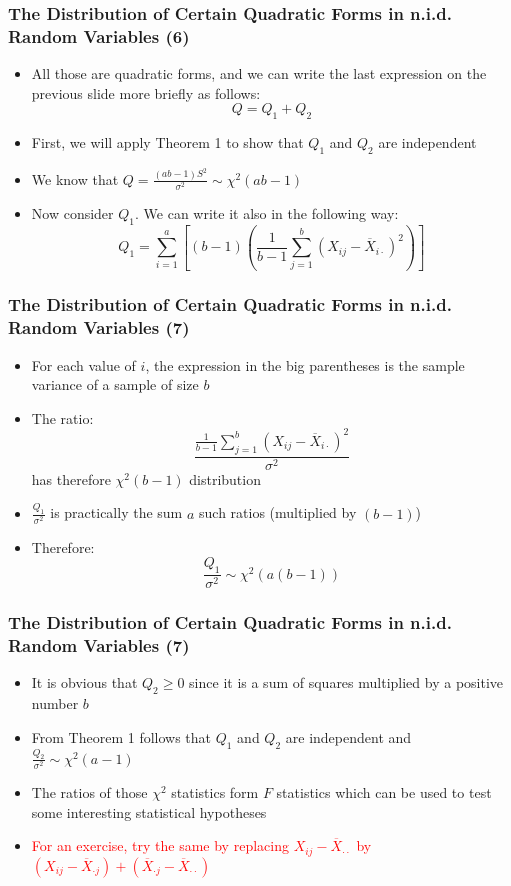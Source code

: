 \documentclass[10pt]{beamer}
\theoremstyle{definition}
\begin{document}
\begin{frame}[fragile]
\frametitle{The Distribution of Certain Quadratic Forms in n.i.d. Random Variables (6)}
\begin{itemize}
	\item All those are quadratic forms, and we can write the last expression on the previous slide more briefly as follows:
	\[
		Q = Q_{1} + Q_{2}
	\]
	\item First, we will apply Theorem 1 to show that $Q_{1}$ and $Q_{2}$ are independent
	\item We know that $\displaystyle Q = \frac{(ab-1)S^{2}}{\sigma^{2}} \sim \chi^{2}(ab-1)$
	\item Now consider $Q_{1}$. We can write it also in the following way:
	\[
		Q_{1} = \sum_{i=1}^{a}\left[(b-1)\left(\frac{1}{b-1}\sum_{j=1}^{b}(X_{ij} - \overline{X}_{i\cdot})^{2}\right)\right]
	\]
\end{itemize}
\end{frame}

\begin{frame}[fragile]
\frametitle{The Distribution of Certain Quadratic Forms in n.i.d. Random Variables (7)}
\begin{itemize}
	\item For each value of $i$, the expression in the big parentheses is the sample variance of a sample of size $b$
	\item The ratio:
	\[
		\frac{\displaystyle \frac{1}{b-1}\sum_{j=1}^{b}(X_{ij} - \overline{X}_{i\cdot})^{2}}{\sigma^{2}}
	\]
	has therefore $\chi^{2}(b-1)$ distribution
	\item $\displaystyle \frac{Q_{1}}{\sigma^{2}}$ is practically the sum $a$ such ratios (multiplied by $(b-1)$)
	\item Therefore:
	\[
		\frac{Q_{1}}{\sigma^{2}} \sim \chi^{2}(a(b-1))
	\]
\end{itemize}
\end{frame}

\begin{frame}[fragile]
\frametitle{The Distribution of Certain Quadratic Forms in n.i.d. Random Variables (7)}
\begin{itemize}
	\item It is obvious that $Q_{2} \geq 0$ since it is a sum of squares multiplied by a positive number $b$
	\item From Theorem 1 follows that $Q_{1}$ and $Q_{2}$ are independent and $\displaystyle \frac{Q_{2}}{\sigma^{2}} \sim \chi^{2}(a-1)$
	\item The ratios of those $\chi^{2}$ statistics form $F$ statistics which can be used to test some interesting statistical hypotheses
	\item \textcolor{red}{For an exercise, try the same by replacing $X_{ij} - \overline{X}_{\cdot\cdot}$ by $(X_{ij} - \overline{X}_{\cdot j}) + (\overline{X}_{\cdot j} -  \overline{X}_{\cdot\cdot})$}
\end{itemize}
\end{frame}
\end{document}
